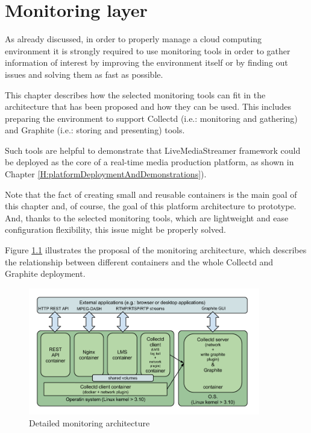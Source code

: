 \chapter{Monitoring layer}\label{G:monitoringLayer}

As already discussed, in order to properly manage a cloud computing environment it is strongly required to use monitoring tools in order to gather information of interest by improving the environment itself or by finding out issues and solving them as fast as possible.

This chapter describes how the selected monitoring tools can fit in the architecture that has been proposed and how they can be used. This includes preparing the environment to support Collectd (i.e.: monitoring and gathering) and Graphite (i.e.: storing and presenting) tools.

Such tools are helpful to demonstrate that LiveMediaStreamer framework could be deployed as the core of a real-time media production platform, as shown in Chapter \ref{H:platformDeploymentAndDemonstrations}).

Note that the fact of creating small and reusable containers is the main goal of this chapter and, of course, the goal of this platform architecture to prototype. And, thanks to the selected monitoring tools, which are lightweight and ease configuration flexibility, this issue might be properly solved.

Figure \ref{F:maex} illustrates the proposal of the monitoring architecture, which describes the relationship between different containers and the whole Collectd and Graphite deployment.

\begin{figure}[htb]
\begin{center}
\includegraphics[width=0.9\textwidth]{./images/monitArchProp.png}
\caption{Detailed monitoring architecture}
\label{F:maex}
\end{center}
\end{figure}

